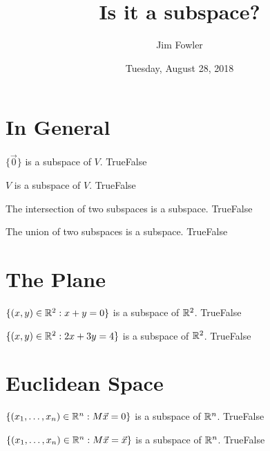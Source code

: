 \documentclass{homework}
\author{Jim Fowler}
\title{Is it a subspace?}
\date{Tuesday, August 28, 2018}
\begin{document}
\maketitle

\newenvironment{truefalse}{\begin{problem}}{\hfill \textsf{True\quad False}\end{problem}}

\section{In General}

\begin{truefalse}
  $\{ \vec{0} \}$ is a subspace of $V$.
\end{truefalse}

\begin{truefalse}
  $V$ is a subspace of $V$.
\end{truefalse}

\begin{truefalse}
  The intersection of two subspaces is a subspace.
\end{truefalse}

\begin{truefalse}
  The union of two subspaces is a subspace.
\end{truefalse}

\section{The Plane}

\begin{truefalse}
  $\{ (x,y) \in \mathbb{R}^2 : x + y = 0 \}$ is a subspace of $\mathbb{R}^2$.
\end{truefalse}

\begin{truefalse}
  $\{ (x,y) \in \mathbb{R}^2 : 2x + 3y = 4 \}$ is a subspace of $\mathbb{R}^2$.
\end{truefalse}

\section{Euclidean Space}

\begin{truefalse}
  $\{ (x_1,\ldots,x_n) \in \mathbb{R}^n : M\vec{x} = 0 \}$ is a subspace of $\mathbb{R}^n$.
\end{truefalse}

\begin{truefalse}
  $\{ (x_1,\ldots,x_n) \in \mathbb{R}^n : M\vec{x} = \vec{x} \}$ is a subspace of $\mathbb{R}^n$.
\end{truefalse}
\end{document}
